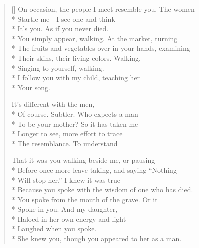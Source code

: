 \label{ch:appearances}
\settowidth{\versewidth}{On occasion, the people I meet resemble you.   The women}
\begin{verse}[\versewidth]
On occasion, the people I meet resemble you.   The women\\*
Startle me---I see one and think\\*
It's you.   As if you never died.\\*
You simply appear, walking. At the market, turning\\*
The fruits and vegetables over in your hands, examining\\*
Their skins, their living colors.   Walking,\\*
Singing to yourself, walking.\\*
I follow you with my child, teaching her\\*
Your song.

 \qquad  \qquad It's different with the men, \\*
Of course.   Subtler.   Who expects a man\\*
To be your mother? So it has taken me\\*
Longer to see, more effort to trace\\*
The resemblance.   To understand

That it was you walking beside me, or pausing\\*
Before once more leave-taking, and saying ``Nothing\\*
Will stop her.'' I knew it was true\\*
Because you spoke with the wisdom of one who has died. \\*
You spoke from the mouth of the grave.   Or it \\*
Spoke in you.   And my daughter,\\*
Haloed in her own energy and light\\*
Laughed when you spoke.\\*
She knew you, though you appeared to her as a man.
\end{verse}
